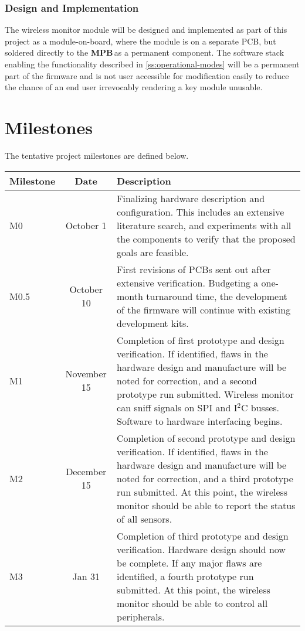 \documentclass[letterpaper]{article}
\newcommand{\MPB}{\textbf{MPB}\,}
\begin{document}
\subsubsection{Design and Implementation}
The wireless monitor module will be designed and implemented as part of this project as a module-on-board, where the module is on a separate PCB, but soldered directly to the \MPB as a permanent component. The software stack enabling the functionality described in \ref{ss:operational-modes} will be a permanent part of the firmware and is not user accessible for modification easily to reduce the chance of an end user irrevocably rendering a key module unusable.



\section{Milestones}

The tentative project milestones are defined below.
\begin{table}[htp!]
\centering
\begin{tabular}{lcp{}}

\toprule
Milestone & Date & Description\\
\midrule

M0 & October 1 & Finalizing hardware description and configuration. This includes an extensive literature search, and experiments with all the components to verify that the proposed goals are feasible. \\
M0.5 & October 10 & First revisions of PCBs sent out after extensive verification. Budgeting a one-month turnaround time, the development of the firmware will continue with existing development kits.\\
M1 & November 15 & Completion of first prototype and design verification. If identified, flaws in the hardware design and manufacture will be noted for correction, and a second prototype run submitted. Wireless monitor can sniff signals on SPI and I$^2$C busses. Software to hardware interfacing begins.\\
M2 & December 15 & Completion of second prototype and design verification. If identified, flaws in the hardware design and manufacture will be noted for correction, and a third prototype run submitted. At this point, the wireless monitor should be able to report the status of all sensors.\\
M3 & Jan 31 & Completion of third prototype and design verification. Hardware design should now be complete. If any major flaws are identified, a fourth prototype run submitted. At this point, the wireless monitor should be able to control all peripherals.\\

\bottomrule
\end{tabular}
\end{table}
\end{document}
